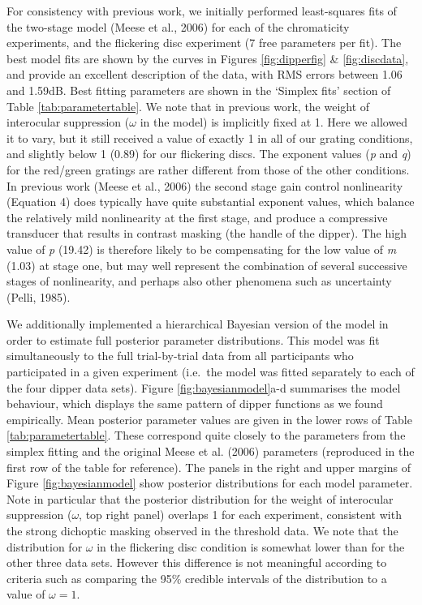 \documentclass[
]{article}
\begin{document}
For consistency with previous work, we initially performed least-squares fits of the two-stage model (Meese et al., 2006) for each of the chromaticity experiments, and the flickering disc experiment (7 free parameters per fit). The best model fits are shown by the curves in Figures \ref{fig:dipperfig} \& \ref{fig:discdata}, and provide an excellent description of the data, with RMS errors between 1.06 and 1.59dB. Best fitting parameters are shown in the `Simplex fits' section of Table \ref{tab:parametertable}. We note that in previous work, the weight of interocular suppression (\(\omega\) in the model) is implicitly fixed at 1. Here we allowed it to vary, but it still received a value of exactly 1 in all of our grating conditions, and slightly below 1 (0.89) for our flickering discs. The exponent values (\emph{p} and \emph{q}) for the red/green gratings are rather different from those of the other conditions. In previous work (Meese et al., 2006) the second stage gain control nonlinearity (Equation 4) does typically have quite substantial exponent values, which balance the relatively mild nonlinearity at the first stage, and produce a compressive transducer that results in contrast masking (the handle of the dipper). The high value of \emph{p} (19.42) is therefore likely to be compensating for the low value of \emph{m} (1.03) at stage one, but may well represent the combination of several successive stages of nonlinearity, and perhaps also other phenomena such as uncertainty (Pelli, 1985).

We additionally implemented a hierarchical Bayesian version of the model in order to estimate full posterior parameter distributions. This model was fit simultaneously to the full trial-by-trial data from all participants who participated in a given experiment (i.e.~the model was fitted separately to each of the four dipper data sets). Figure \ref{fig:bayesianmodel}a-d summarises the model behaviour, which displays the same pattern of dipper functions as we found empirically. Mean posterior parameter values are given in the lower rows of Table \ref{tab:parametertable}. These correspond quite closely to the parameters from the simplex fitting and the original Meese et al. (2006) parameters (reproduced in the first row of the table for reference). The panels in the right and upper margins of Figure \ref{fig:bayesianmodel} show posterior distributions for each model parameter. Note in particular that the posterior distribution for the weight of interocular suppression (\(\omega\), top right panel) overlaps 1 for each experiment, consistent with the strong dichoptic masking observed in the threshold data. We note that the distribution for \(\omega\) in the flickering disc condition is somewhat lower than for the other three data sets. However this difference is not meaningful according to criteria such as comparing the 95\% credible intervals of the distribution to a value of \(\omega=1\).
\end{document}
